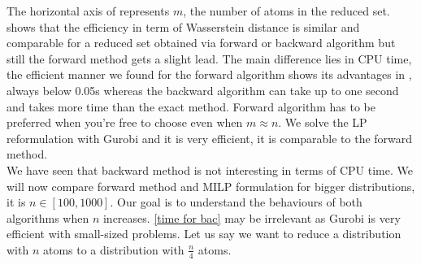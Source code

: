\documentclass{amsart}
\begin{document}
The horizontal axis of  represents $m$, the number of atoms in the reduced set.  shows that the efficiency in term of Wasserstein distance is similar and comparable for a reduced set obtained via forward or backward algorithm but still the forward method gets a slight lead. The main difference lies in CPU time, the efficient manner we found for the forward algorithm shows its advantages in , always below 0.05s whereas the backward algorithm can take up to one second and takes more time than the exact method. Forward algorithm has to be preferred when you're free to choose even when $m\approx n$. We solve the LP reformulation with Gurobi and it is very efficient, it is comparable to the forward method.\\
We have seen that backward method is not interesting in terms of CPU time. We will now compare forward method and MILP formulation for bigger distributions, it is $n\in\left[100,1000\right]$. Our goal is to understand the behaviours of both algorithms when $n$ increases. \ref{time for bac} may be irrelevant as Gurobi is very efficient with small-sized problems. Let us say we want to reduce a distribution with $n$ atoms to a distribution with $\frac{n}{4}$ atoms.
\end{document}
